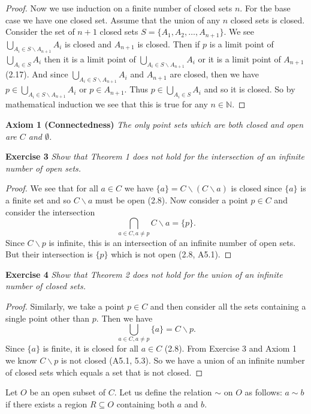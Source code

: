 \documentclass{article}
\begin{document}
\begin{flushleft}
\begin{proof}
Now we use induction on a finite number of closed sets $n$. For the base case we have one closed set. Assume that the union of any $n$ closed sets is closed. Consider the set of $n+1$ closed sets $S=\{A_1,A_2, \dots ,A_{n+1} \}$. We see $\bigcup_{A_i \in S \backslash A_{n+1}} A_i$ is closed and $A_{n+1}$ is closed. Then if $p$ is a limit point of $\bigcup_{A_i \in S} A_i$ then it is a limit point of $\bigcup_{A_i \in S \backslash A_{n+1}} A_i$ or it is a limit point of $A_{n+1}$ (2.17). And since $\bigcup_{A_i \in S \backslash A_{n+1}} A_i$ and $A_{n+1}$ are closed, then we have $p \in \bigcup_{A_i \in S \backslash A_{n+1}} A_i$ or $p \in A_{n+1}$. Thus $p \in \bigcup_{A_i \in S} A_i$ and so it is closed. So by mathematical induction we see that this is true for any $n \in \mathbb{N}$.
\end{proof}

\textbf{Axiom 1 (Connectedness)}
\textsl{The only point sets which are both closed and open are $C$ and $\emptyset$.}\newline

\textbf{Exercise 3}
\textsl{Show that Theorem 1 does not hold for the intersection of an infinite number of open sets.}
\begin{proof}
We see that for all $a \in C$ we have $\{a\}=C \backslash (C \backslash a)$ is closed since $\{a\}$ is a finite set and so $C \backslash a$ must be open (2.8). Now consider a point $p \in C$ and consider the intersection
\[
\bigcap_{a \in C, a \neq p} C \backslash a = \{p\}.
\]
Since $C \backslash p$ is infinite, this is an intersection of an infinite number of open sets. But their intersection is $\{p\}$ which is not open (2.8, A5.1).
\end{proof}

\textbf{Exercise 4}
\textsl{Show that Theorem 2 does not hold for the union of an infinite number of closed sets.}
\begin{proof}
Similarly, we take a point $p \in C$ and then consider all the sets containing a single point other than $p$. Then we have
\[
\bigcup_{a \in C, a \neq p} \{a\} = C \backslash p.
\]
Since $\{a\}$ is finite, it is closed for all $a \in C$ (2.8). From Exercise 3 and Axiom 1 we know $C \backslash p$ is not closed (A5.1, 5.3). So we have a union of an infinite number of closed sets which equals a set that is not closed.
\end{proof}

Let $O$ be an open subset of $C$. Let us define the relation $\sim$ on $O$ as follows: $a \sim b$ if there exists a region $R \subseteq O$ containing both $a$ and $b$.\newline


\end{flushleft}
\end{document}
